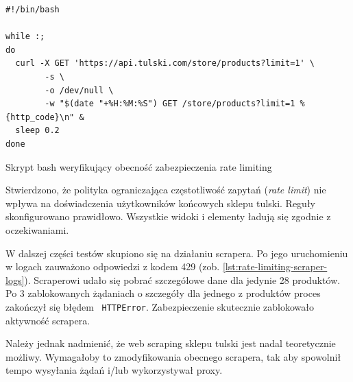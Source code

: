 \begin{listing}[H]
    \begin{verbatim}
#!/bin/bash

while :;
do
  curl -X GET 'https://api.tulski.com/store/products?limit=1' \
        -s \
        -o /dev/null \
        -w "$(date "+%H:%M:%S") GET /store/products?limit=1 %{http_code}\n" &
  sleep 0.2
done
    \end{verbatim}
    \caption{Skrypt bash weryfikujący obecność zabezpieczenia rate limiting}
    \label{lst:bash-rate-limit}
\end{listing}

Stwierdzono, że polityka ograniczająca częstotliwość zapytań (\emph{rate limit}) nie wpływa na doświadczenia użytkowników końcowych sklepu tulski.
Reguły skonfigurowano prawidłowo.
Wszystkie widoki i elementy ładują się zgodnie z oczekiwaniami.

W dalszej części testów skupiono się na działaniu scrapera.
Po jego uruchomieniu w logach zauważono odpowiedzi z kodem 429 (zob. \autoref{lst:rate-limiting-scraper-logs}).
Scraperowi udało się pobrać szczegółowe dane dla jedynie 28 produktów.
Po 3 zablokowanych żądaniach o szczegóły dla jednego z produktów proces zakończył się błędem ~\texttt{HTTPError}.
Zabezpieczenie skutecznie zablokowało aktywność scrapera.

Należy jednak nadmienić, że web scraping sklepu tulski jest nadal teoretycznie możliwy.
Wymagałoby to zmodyfikowania obecnego scrapera, tak aby spowolnił tempo wysyłania żądań i/lub wykorzystywał proxy.

